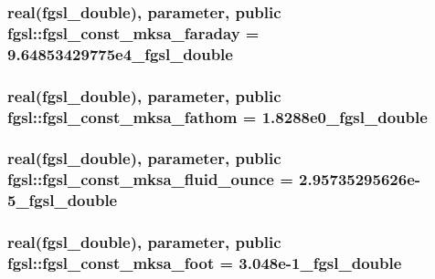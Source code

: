 \hypertarget{classfgsl_a7a5c5ad37eb790e7372f127324e5fc9f}{
\subsubsection[{fgsl\-\_\-const\-\_\-mksa\-\_\-faraday}]{\setlength{\rightskip}{0pt plus 5cm}real({\bf fgsl\-\_\-double}), parameter, public fgsl\-::fgsl\-\_\-const\-\_\-mksa\-\_\-faraday = 9.\-64853429775e4\-\_\-fgsl\-\_\-double}}\label{classfgsl_a7a5c5ad37eb790e7372f127324e5fc9f}
\hypertarget{classfgsl_a1b3e809c97882aeaebf2e325079f38a3}{
\subsubsection[{fgsl\-\_\-const\-\_\-mksa\-\_\-fathom}]{\setlength{\rightskip}{0pt plus 5cm}real({\bf fgsl\-\_\-double}), parameter, public fgsl\-::fgsl\-\_\-const\-\_\-mksa\-\_\-fathom = 1.\-8288e0\-\_\-fgsl\-\_\-double}}\label{classfgsl_a1b3e809c97882aeaebf2e325079f38a3}
\hypertarget{classfgsl_af688bbef5ebab7dfd674fad9cf5d8bd3}{
\subsubsection[{fgsl\-\_\-const\-\_\-mksa\-\_\-fluid\-\_\-ounce}]{\setlength{\rightskip}{0pt plus 5cm}real({\bf fgsl\-\_\-double}), parameter, public fgsl\-::fgsl\-\_\-const\-\_\-mksa\-\_\-fluid\-\_\-ounce = 2.\-95735295626e-\/5\-\_\-fgsl\-\_\-double}}\label{classfgsl_af688bbef5ebab7dfd674fad9cf5d8bd3}
\hypertarget{classfgsl_acff74ed42941dc6324409ba0eee894ee}{
\subsubsection[{fgsl\-\_\-const\-\_\-mksa\-\_\-foot}]{\setlength{\rightskip}{0pt plus 5cm}real({\bf fgsl\-\_\-double}), parameter, public fgsl\-::fgsl\-\_\-const\-\_\-mksa\-\_\-foot = 3.\-048e-\/1\-\_\-fgsl\-\_\-double}}\label{classfgsl_acff74ed42941dc6324409ba0eee894ee}
